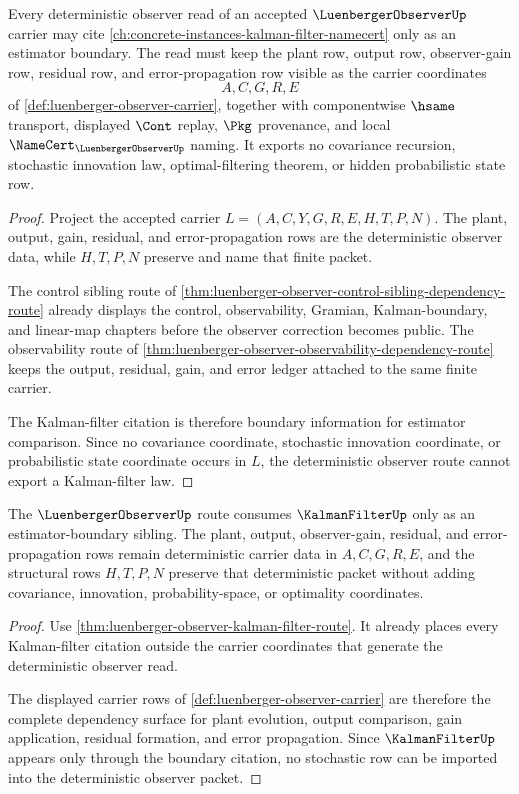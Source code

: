 \begin{theorem}
\label{thm:luenberger-observer-kalman-filter-route}
Every deterministic observer read of an accepted $\LuenbergerObserverUp$ carrier may cite \autoref{ch:concrete-instances-kalman-filter-namecert} only as an estimator boundary. The read must keep the plant row, output row, observer-gain row, residual row, and error-propagation row visible as the carrier coordinates
$$
A,C,G,R,E
$$
of \autoref{def:luenberger-observer-carrier}, together with componentwise $\hsame$ transport, displayed $\Cont$ replay, $\Pkg$ provenance, and local $\NameCert_{\LuenbergerObserverUp}$ naming. It exports no covariance recursion, stochastic innovation law, optimal-filtering theorem, or hidden probabilistic state row.
\end{theorem}
\begin{proof}
Project the accepted carrier $L=(A,C,Y,G,R,E,H,T,P,N)$. The plant, output, gain, residual, and error-propagation rows are the deterministic observer data, while $H,T,P,N$ preserve and name that finite packet.

The control sibling route of \autoref{thm:luenberger-observer-control-sibling-dependency-route} already displays the control, observability, Gramian, Kalman-boundary, and linear-map chapters before the observer correction becomes public. The observability route of \autoref{thm:luenberger-observer-observability-dependency-route} keeps the output, residual, gain, and error ledger attached to the same finite carrier.

The Kalman-filter citation is therefore boundary information for estimator comparison. Since no covariance coordinate, stochastic innovation coordinate, or probabilistic state coordinate occurs in $L$, the deterministic observer route cannot export a Kalman-filter law.
\end{proof}

\begin{theorem}
\label{thm:luenberger-observer-kalman-filter-dependency}
The $\LuenbergerObserverUp$ route consumes $\KalmanFilterUp$ only as an estimator-boundary sibling. The plant, output, observer-gain, residual, and error-propagation rows remain deterministic carrier data in $A,C,G,R,E$, and the structural rows $H,T,P,N$ preserve that deterministic packet without adding covariance, innovation, probability-space, or optimality coordinates.
\end{theorem}
\begin{proof}
Use \autoref{thm:luenberger-observer-kalman-filter-route}. It already places every Kalman-filter citation outside the carrier coordinates that generate the deterministic observer read.

The displayed carrier rows of \autoref{def:luenberger-observer-carrier} are therefore the complete dependency surface for plant evolution, output comparison, gain application, residual formation, and error propagation. Since $\KalmanFilterUp$ appears only through the boundary citation, no stochastic row can be imported into the deterministic observer packet.
\end{proof}
